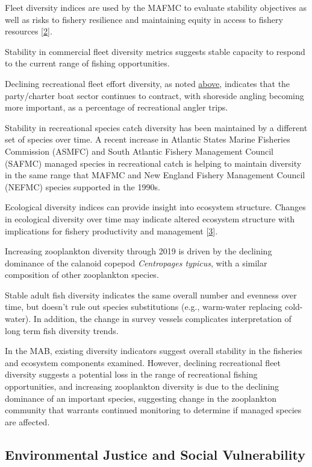 \documentclass[
  10pt,
]{article}
\begin{document}
Fleet diversity indices are used by the MAFMC to evaluate stability
objectives as well as risks to fishery resilience and maintaining equity
in access to fishery resources
{[}\protect\hyperlink{ref-gaichas_implementing_2018}{2}{]}.

Stability in commercial fleet diversity metrics suggests stable capacity
to respond to the current range of fishing opportunities.

Declining recreational fleet effort diversity, as noted
\protect\hyperlink{recreational-opportunities}{above}, indicates that
the party/charter boat sector continues to contract, with shoreside
angling becoming more important, as a percentage of recreational angler
trips.

Stability in recreational species catch diversity has been maintained by
a different set of species over time. A recent increase in Atlantic
States Marine Fisheries Commission (ASMFC) and South Atlantic Fishery
Management Council (SAFMC) managed species in recreational catch is
helping to maintain diversity in the same range that MAFMC and New
England Fishery Management Council (NEFMC) species supported in the
1990s.

Ecological diversity indices can provide insight into ecosystem
structure. Changes in ecological diversity over time may indicate
altered ecosystem structure with implications for fishery productivity
and management {[}\protect\hyperlink{ref-friedland_changes_2020}{3}{]}.

Increasing zooplankton diversity through 2019 is driven by the declining
dominance of the calanoid copepod \emph{Centropages typicus}, with a
similar composition of other zooplankton species.

Stable adult fish diversity indicates the same overall number and
evenness over time, but doesn't rule out species substitutions (e.g.,
warm-water replacing cold-water). In addition, the change in survey
vessels complicates interpretation of long term fish diversity trends.

In the MAB, existing diversity indicators suggest overall stability in
the fisheries and ecosystem components examined. However, declining
recreational fleet diversity suggests a potential loss in the range of
recreational fishing opportunities, and increasing zooplankton diversity
is due to the declining dominance of an important species, suggesting
change in the zooplankton community that warrants continued monitoring
to determine if managed species are affected.

\hypertarget{environmental-justice-and-social-vulnerability}{%
\subsection{Environmental Justice and Social
Vulnerability}\label{environmental-justice-and-social-vulnerability}}
\end{document}
